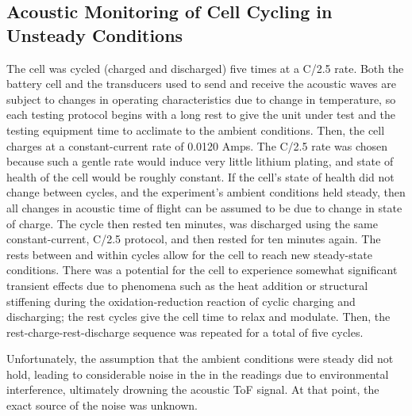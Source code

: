\subsection{Acoustic Monitoring of Cell Cycling in Unsteady Conditions}

The cell was cycled (charged and discharged) five times at a C/2.5 rate. 
Both the battery cell and the transducers used to send and receive the acoustic waves are subject to changes in operating characteristics due to change in temperature, so each testing protocol begins with a long rest to give the unit under test and the testing equipment time to acclimate to the ambient conditions. 
Then, the cell charges at a constant-current rate of 0.0120 Amps. 
The C/2.5 rate was chosen because such a gentle rate would induce very little lithium plating, and state of health of the cell would be roughly constant. 
If the cell's state of health did not change between cycles, and the experiment's ambient conditions held steady, then all changes in acoustic time of flight can be assumed to be due to change in state of charge.
The cycle then rested ten minutes, was discharged using the same constant-current, C/2.5 protocol, and then rested for ten minutes again. 
The rests between and within cycles allow for the cell to reach new steady-state conditions. 
There was a potential for the cell to experience somewhat significant transient effects due to phenomena such as the heat addition or structural stiffening during the oxidation-reduction reaction of cyclic charging and discharging; the rest cycles give the cell time to relax and modulate.
Then, the rest-charge-rest-discharge sequence was repeated for a total of five cycles.


Unfortunately, the assumption that the ambient conditions were steady did not hold, leading to considerable noise in the in the readings due to environmental interference, ultimately drowning the acoustic ToF signal. At that point, the exact source of the noise was unknown.

    
